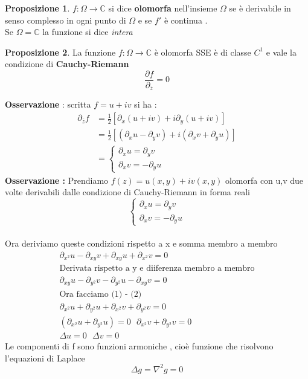 \documentclass{article}
\theoremstyle{definition}
\newtheorem*{proposizione}{Proposizione}
\newcommand{\C}{\mathbb{C}}
\begin{document}
	\begin{proposizione}
		$f:\Omega \rightarrow \C$ si dice \textbf{olomorfa} nell'insieme $\Omega$ se è derivabile in senso complesso in ogni punto di $\Omega$ e se $f'$ è continua . \\
		Se $\Omega =\C$ la funzione si dice \textit{intera}
	\end{proposizione}
	\begin{proposizione}
	La funzione 	$f:\Omega \rightarrow \C$  è olomorfa SSE è di classe $C^1$ e vale la condizione di \textbf{Cauchy-Riemann} 
	$$\frac{\partial f}{\partial_{\overline{z}}}=0$$
		\end{proposizione}
	\textbf{Osservazione} : scritta $f=u+iv$ si ha : 
	\begin{align*}
		\partial_{\overline{z}}f&=\frac{1}{2}[\partial_x(u+iv)+i\partial_y(u+iv)] \\
		&= \frac{1}{2} \left[(\partial_xu-\partial_yv)+i(\partial_xv+\partial_yu)\right] \\
		&=\begin{cases}
			\partial_xu=\partial_yv\\
			\partial_xv=-\partial_yu
		\end{cases}
	\end{align*}
	\textbf{Osservazione : } Prendiamo $f(z)=u(x,y)+iv(x,y)$ olomorfa con u,v due volte derivabili dalle condizione di Cauchy-Riemann in forma reali  $$\begin{cases}
		\partial_xu=\partial_yv\\
		\partial_xv=-\partial_yu
	\end{cases}$$ \\
	Ora deriviamo queste condizioni rispetto a x e somma membro a membro 
	\begin{align*}
\partial_{x^2}u-\partial_{xy}v+\partial_{xy}u+\partial_{x^2}v=0 \\
\text{Derivata rispetto a y e diiferenza membro a membro} \\
\partial_{xy}u-\partial_{y^2}v-\partial_{y^2}u-\partial_{xy}v=0 \\
\text{Ora facciamo (1) - (2)}\\
\partial_{x^2}u+\partial_{y^2}u+\partial_{x^2}v+\partial_{y^2}v=0 \\
(\partial_{x^2}u+\partial_{y^2}u)=0 \ \ \ \partial_{x^2}v+\partial_{y^2}v=0 \\
\Delta u=0 \ \ \ \Delta v=0
	\end{align*}
	Le componenti di f sono funzioni armoniche , cioè funzione che risolvono l'equazioni di Laplace $$\Delta g=\nabla^2 g =0$$
\end{document}
